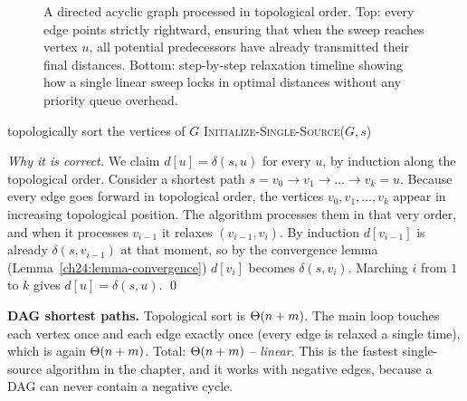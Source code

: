 \begin{figure}[h]
\caption{A directed acyclic graph processed in topological order. Top: every edge points strictly rightward, ensuring that when the sweep reaches vertex $u$, all potential predecessors have already transmitted their final distances. Bottom: step-by-step relaxation timeline showing how a single linear sweep locks in optimal distances without any priority queue overhead.}
\label{ch24:dag-sweep}
\end{figure}

\begin{algorithm}[H]
\caption{\textsc{DAG-Shortest-Paths}($G, w, s$)}
topologically sort the vertices of $G$\;
\textsc{Initialize-Single-Source}($G,s$)\;
\end{algorithm}

\begin{formalbox}
\emph{Why it is correct.} We claim $d[u]=\delta(s,u)$ for every $u$, by induction
along the topological order. Consider a shortest path
$s = v_0 \to v_1 \to \dots \to v_k = u$. Because every edge goes forward in
topological order, the vertices $v_0, v_1, \dots, v_k$ appear in increasing
topological position. The algorithm processes them in that very order, and when it
processes $v_{i-1}$ it relaxes $(v_{i-1}, v_i)$. By induction $d[v_{i-1}]$ is
already $\delta(s,v_{i-1})$ at that moment, so by the convergence lemma
(Lemma~\ref{ch24:lemma-convergence}) $d[v_i]$ becomes $\delta(s,v_i)$. Marching
$i$ from $1$ to $k$ gives $d[u]=\delta(s,u)$. \qed
\end{formalbox}

\begin{complexitybox}
\textbf{DAG shortest paths.} Topological sort is $\Theta(n+m)$. The main loop touches
each vertex once and each edge exactly once (every edge is relaxed a single time),
which is again $\Theta(n+m)$. Total: $\Theta(n+m)$ -- \emph{linear}. This is the fastest
single-source algorithm in the chapter, and it works with negative edges, because
a DAG can never contain a negative cycle.
\end{complexitybox}

